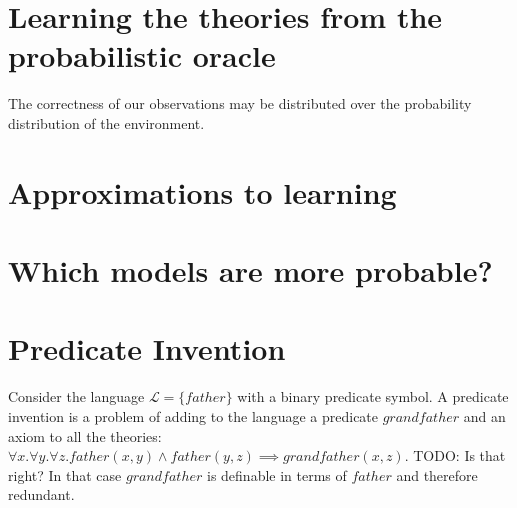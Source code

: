 \subsection{}

\section{Learning the theories from the probabilistic oracle}
The correctness of our observations may be distributed over the probability distribution of the environment.
\section{Approximations to learning}
\section{Which models are more probable?}
\section{Predicate Invention}
Consider the language $\mathcal{L}=\{father\}$ with a binary predicate symbol. A predicate invention is a problem of adding to the language a predicate $grandfather$ and an axiom to all the theories: $\forall x. \forall y. \forall z. father(x,y) \wedge father(y,z) \implies grandfather(x,z)$.
TODO: Is that right? In that case $grandfather$ is definable in terms of $father$ and therefore redundant.
\fi